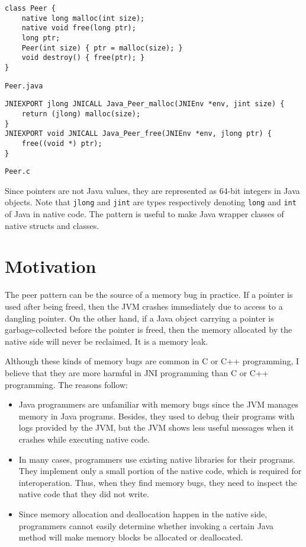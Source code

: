 \documentclass[acmsmall,screen]{acmart}
\begin{document}
\begin{lstlisting}[style=javastyle]
class Peer {
    native long malloc(int size);
    native void free(long ptr);
    long ptr;
    Peer(int size) { ptr = malloc(size); }
    void destroy() { free(ptr); }
}
\end{lstlisting}
\vspace*{-1em}
\begin{flushright}
{\footnotesize\tt Peer.java}
\end{flushright}
\vspace*{-0.5em}
\begin{lstlisting}[style=cstyle]
JNIEXPORT jlong JNICALL Java_Peer_malloc(JNIEnv *env, jint size) {
    return (jlong) malloc(size);
}
JNIEXPORT void JNICALL Java_Peer_free(JNIEnv *env, jlong ptr) {
    free((void *) ptr);
}
\end{lstlisting}
\vspace*{-1em}
\begin{flushright}
{\footnotesize\tt Peer.c}
\end{flushright}

Since pointers are not Java values, they are represented as 64-bit integers in
Java objects. Note that {\tt jlong} and {\tt jint} are types respectively denoting
{\tt long} and {\tt int} of Java in native code. The pattern is useful to make
Java wrapper classes of native structs and classes.

\section{Motivation}

The peer pattern can be the source of a memory bug in practice. If a pointer is
used after being freed, then the JVM crashes immediately due to access to a
dangling pointer. On the other hand, if a Java object carrying a pointer is
garbage-collected before the pointer is freed, then the memory allocated by the
native side will never be reclaimed. It is a memory leak.

Although these kinds of memory bugs are common in C or C++ programming, I
believe that they are more harmful in JNI programming than C or C++
programming. The reasons follow:
\begin{itemize}
    \item Java programmers are unfamiliar with memory bugs since the JVM
      manages memory in Java programs. Besides, they used to debug
      their programs with logs provided by the JVM, but the JVM shows less useful
      messages when it crashes while executing native code.
    \item In many cases, programmers use existing native libraries for their
      programs. They implement only a small portion of the native code,
      which is required for interoperation. Thus, when they
      find memory bugs, they need to inspect the native code that they did not
      write.
    \item Since memory allocation and deallocation happen in the native side,
      programmers cannot easily determine whether invoking a certain Java method
      will make memory blocks be allocated or deallocated.
\end{itemize}
\end{document}
